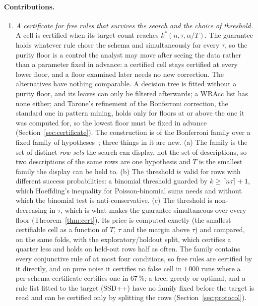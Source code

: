 \documentclass[11pt]{article}
\begin{document}
\paragraph{Contributions.}
\begin{enumerate}
\item \emph{A certificate for free rules that survives the search and the choice of threshold.} A cell is certified when its target count reaches $k^*(n,\tau,\alpha/T)$. The guarantee holds whatever rule chose the schema and simultaneously for every $\tau$, so the purity floor is a control the analyst may move after seeing the data rather than a parameter fixed in advance: a certified cell stays certified at every lower floor, and a floor examined later needs no new correction. The alternatives have nothing comparable. A decision tree is fitted without a purity floor, and its leaves can only be filtered afterwards; a WRAcc list has none either; and Tarone's refinement of the Bonferroni correction, the standard one in pattern mining, holds only for floors at or above the one it was computed for, so the lowest floor must be fixed in advance (Section~\ref{sec:certificate}). The construction is of the Bonferroni family over a fixed family of hypotheses~\citep{webb2007}; three things in it are new. (a) The family is the set of distinct \emph{row sets} the search can display, not the set of descriptions, so two descriptions of the same rows are one hypothesis and $T$ is the smallest family the display can be held to. (b) The threshold is valid for rows with different success probabilities: a binomial threshold guarded by $k\ge\lceil n\tau\rceil+1$, which Hoeffding's inequality for Poisson-binomial sums needs and without which the binomial test is anti-conservative. (c) The threshold is non-decreasing in $\tau$, which is what makes the guarantee simultaneous over every floor (Theorem~\ref{thm:cert}). Its price is computed exactly (the smallest certifiable cell as a function of $T$, $\tau$ and the margin above $\tau$) and compared, on the same folds, with the exploratory/holdout split, which certifies a quarter less and holds on held-out rows half as often. The family contains every conjunctive rule of at most four conditions, so free rules are certified by it directly, and on pure noise it certifies no false cell in $1\,000$ runs where a per-schema certificate certifies one in 67\,\%; a tree, greedy or optimal, and a rule list fitted to the target (SSD++) have no family fixed before the target is read and can be certified only by splitting the rows (Section~\ref{sec:protocol}).

\end{enumerate}
\end{document}

